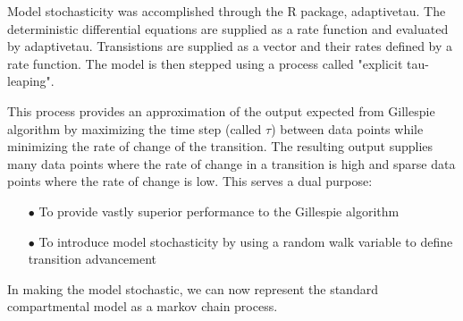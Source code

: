 \documentclass[../Paper.tex]{subfiles}
\begin{document}
Model stochasticity was accomplished through the R package, adaptivetau\cite{johnson_2016}.
The deterministic differential equations are supplied as a rate function and evaluated
by adaptivetau. Transistions are supplied as a vector and their rates defined by
a rate function. The model is then stepped using a process called 
"explicit tau-leaping"\cite{yang_gillespie_petzold_2007}.

This process provides an approximation of the output expected from Gillespie algorithm by maximizing
the time step (called $\tau$) between data points while minimizing the rate of change
of the transition. The resulting output supplies many data points where the rate of
change in a transition is high and sparse data points where the rate
of change is low. This serves a dual purpose:

\begin{enumerate}
  \item[$\bullet$]{To provide vastly superior performance to the Gillespie algorithm}
  \item[$\bullet$]{To introduce model stochasticity by using a random walk variable
                   to define transition advancement}
\end{enumerate}
 
In making the model stochastic, we can now represent the standard compartmental model
as a markov chain process. 
\end{document}
